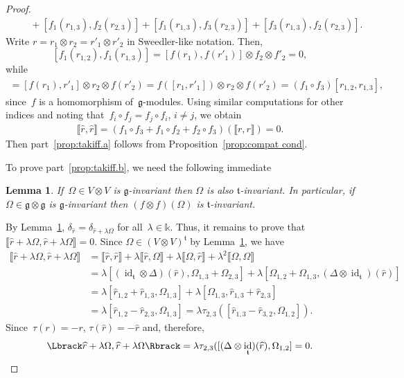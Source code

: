 \documentclass[12pt, reqno]{amsart}
\newcommand{\cybe}[1]{\mathbb{\Lbrack}#1,#1\mathbb{\Rbrack}}
\newcommand{\cyb}[2]{\mathbb{\Lbrack}#1,#2\mathbb{\Rbrack}}
\newcommand{\wh}[1]{\widehat{#1}}
\newtheorem{lemma}[theorem]{Lemma}
\theoremstyle{definition}
\numberwithin{equation}{section}
\newcommand{\tensor}{\otimes}
\newcommand{\kk}{\mathbb{k}}\newcommand{\lie}[1]{{\mathfrak{#1}}}
\DeclareMathOperator{\id}{id}
\begin{document}
\begin{proof}
\begin{align*}
&\phantom{=}+[f_1(r_{1,3}),
f_2(r_{2,3})]+[f_1(r_{1,3}),
f_3(r_{2,3})]+[f_3(r_{1,3}),
f_2(r_{2,3})].
\end{align*}
Write $r=r_1\tensor r_2=r'_1\tensor r'_2$ in Sweedler-like notation. Then,
$$
[f_1(r_{1,2}),f_1(r_{1,3})]=[f(r_1),f(r'_1)]\tensor f_2\tensor f'_2=0,
$$
while 
\begin{align*}
[f_1(r_{1,2}),
f_3(r_{1,3})]=[f(r_1),r'_1]\tensor r_2\tensor f(r'_2)=
f([r_1,r'_1])\tensor r_2\tensor f(r'_2)=(f_1\circ f_3)[r_{1,2},r_{1,3}],
\end{align*}
since~$f$ is a homomorphism of~$\lie g$-modules. 
Using similar computations for other indices and noting that~$f_i\circ f_j=f_j\circ f_i$, $i\not=j$, we obtain
\begin{align*}
\cybe{\wh{r}}=(f_1\circ f_3+f_1\circ f_2+f_2\circ f_3)(\cybe{r})=0.
\end{align*}
Then part~\ref{prop:takiff.a} follows from Proposition~\ref{prop:compat cond}. 

To prove part~\ref{prop:takiff.b}, we need the following immediate
\begin{lemma}\label{lem:takiff inv}
If~$\Omega\in V\tensor V$ is $\lie g$-invariant then $\Omega$ is also $\lie t$-invariant. In particular, 
if $\Omega\in \lie g\tensor\lie g$ is $\lie g$-invariant then $(f\tensor f)(\Omega)$ is $\lie t$-invariant.
\end{lemma}
By Lemma~\ref{lem:takiff inv},
$\delta_{\wh{r}}=\delta_{\wh{r}+\lambda\Omega}$ for all~$\lambda\in\kk$. Thus, it remains to prove that~$\cybe{\wh{r}+\lambda\Omega}=0$. Since $\Omega\in (V\tensor V)^{\lie t}$ by Lemma~\ref{lem:takiff inv}, we have 
\begin{align*}
\cybe{\wh{r}+\lambda\Omega}&=
\cyb{\wh{r}}{\wh{r}}+\lambda\cyb{\wh{r}}{\Omega}
+\lambda\cyb{\Omega}{\wh{r}}+\lambda^2\cybe{\Omega}\\
&=\lambda[(\id_{\lie t}\tensor\Delta)(\wh{r}),\Omega_{1,3}+\Omega_{2,3}]
+\lambda[\Omega_{1,2}+\Omega_{1,3},(\Delta\tensor\id_{\lie t})(\wh{r})]\\
&=\lambda[\wh{r}_{1,2}+\wh{r}_{1,3},\Omega_{1,3}]
+\lambda[\Omega_{1,3},\wh{r}_{1,3}+\wh{r}_{2,3}]\\
&=\lambda[\wh{r}_{1,2}-\wh{r}_{2,3},\Omega_{1,3}]
=\lambda\tau_{2,3}([\wh{r}_{1,3}-\wh{r}_{3,2},\Omega_{1,2}]).
\end{align*}
Since~$\tau(r)=-r$, $\tau(\wh{r})=-\wh{r}$ and, therefore, 
\begin{equation*}
\cybe{\wh{r}+\lambda\Omega}=\lambda\tau_{2,3}([(\Delta\tensor\id_{\lie t})(\wh{r}),\Omega_{1,2}]=0.\qedhere
\end{equation*}
\end{proof}
\end{document}
